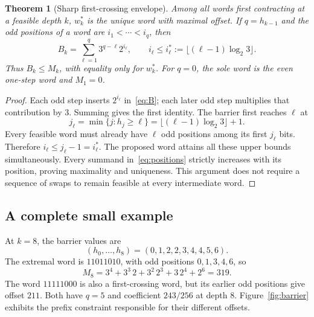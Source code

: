 \documentclass[11pt,a4paper]{amsart}
\newtheorem{theorem}{Theorem}[section]
\theoremstyle{definition}
\theoremstyle{remark}
\begin{document}
\begin{theorem}[Sharp first-crossing envelope]\label{thm:envelope}
Among all words first contracting at a feasible depth $k$, $w_k^*$ is the
unique word with maximal offset. If $q=h_{k-1}$ and the odd positions of
a word are $i_1<\cdots<i_q$, then
\begin{equation}\label{eq:positions}
B_k=\sum_{\ell=1}^q3^{q-\ell}2^{i_\ell},\qquad
i_\ell\le i_\ell^*:=\lfloor(\ell-1)\log_2 3\rfloor.
\end{equation}
Thus $B_k\le M_k$, with equality only for $w_k^*$.
For $q=0$, the sole word is the even one-step word and $M_1=0$.
\end{theorem}
\begin{proof}
Each odd step inserts $2^{i_\ell}$ in~\eqref{eq:B}; each later odd step
multiplies that contribution by 3. Summing gives the first identity.
The barrier first reaches $\ell$ at
\[
j_\ell=\min\{j:h_j\ge\ell\}
=\lfloor(\ell-1)\log_2 3\rfloor+1.
\]
Every feasible word must already have $\ell$ odd positions among its
first $j_\ell$ bits. Therefore $i_\ell\le j_\ell-1=i_\ell^*$.
The proposed word attains all these upper bounds simultaneously.
Every summand in~\eqref{eq:positions} strictly increases with its
position, proving maximality and uniqueness. This argument does not
require a sequence of swaps to remain feasible at every intermediate word.
\end{proof}


\subsection*{A complete small example}
At $k=8$, the barrier values are
\[
(h_0,\ldots,h_8)=(0,1,2,2,3,4,4,5,6).
\]
The extremal word is $11011010$, with
odd positions $0,1,3,4,6$, so
\[
M_8=3^4+3^3\,2+3^2\,2^3+3\,2^4+2^6=319.
\]
The word $11111000$ is also a first-crossing word, but its earlier odd
positions give offset $211$. Both have $q=5$ and coefficient
$243/256$ at depth 8. Figure~\ref{fig:barrier} exhibits the prefix
constraint responsible for their different offsets.
\end{document}
